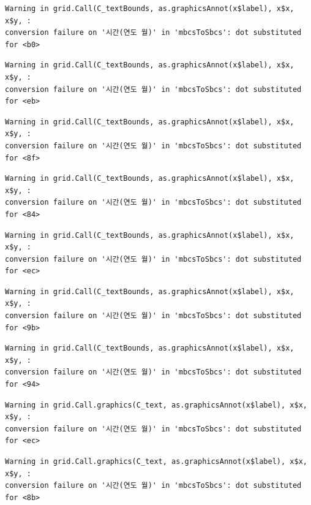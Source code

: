 \documentclass[
  letterpaper,
  DIV=11,
  numbers=noendperiod]{scrreprt}
\begin{document}
\begin{verbatim}
Warning in grid.Call(C_textBounds, as.graphicsAnnot(x$label), x$x, x$y, :
conversion failure on '시간(연도 월)' in 'mbcsToSbcs': dot substituted for <b0>
\end{verbatim}

\begin{verbatim}
Warning in grid.Call(C_textBounds, as.graphicsAnnot(x$label), x$x, x$y, :
conversion failure on '시간(연도 월)' in 'mbcsToSbcs': dot substituted for <eb>
\end{verbatim}

\begin{verbatim}
Warning in grid.Call(C_textBounds, as.graphicsAnnot(x$label), x$x, x$y, :
conversion failure on '시간(연도 월)' in 'mbcsToSbcs': dot substituted for <8f>
\end{verbatim}

\begin{verbatim}
Warning in grid.Call(C_textBounds, as.graphicsAnnot(x$label), x$x, x$y, :
conversion failure on '시간(연도 월)' in 'mbcsToSbcs': dot substituted for <84>
\end{verbatim}

\begin{verbatim}
Warning in grid.Call(C_textBounds, as.graphicsAnnot(x$label), x$x, x$y, :
conversion failure on '시간(연도 월)' in 'mbcsToSbcs': dot substituted for <ec>
\end{verbatim}

\begin{verbatim}
Warning in grid.Call(C_textBounds, as.graphicsAnnot(x$label), x$x, x$y, :
conversion failure on '시간(연도 월)' in 'mbcsToSbcs': dot substituted for <9b>
\end{verbatim}

\begin{verbatim}
Warning in grid.Call(C_textBounds, as.graphicsAnnot(x$label), x$x, x$y, :
conversion failure on '시간(연도 월)' in 'mbcsToSbcs': dot substituted for <94>
\end{verbatim}

\begin{verbatim}
Warning in grid.Call.graphics(C_text, as.graphicsAnnot(x$label), x$x, x$y, :
conversion failure on '시간(연도 월)' in 'mbcsToSbcs': dot substituted for <ec>
\end{verbatim}

\begin{verbatim}
Warning in grid.Call.graphics(C_text, as.graphicsAnnot(x$label), x$x, x$y, :
conversion failure on '시간(연도 월)' in 'mbcsToSbcs': dot substituted for <8b>
\end{verbatim}
\end{document}
